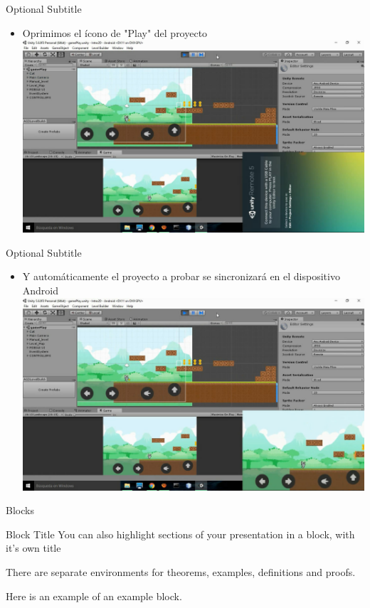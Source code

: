 \documentclass{beamer}
\begin{document}
\begin{frame}{07}{Optional Subtitle}
  \begin{itemize}
  \item {
    Oprimimos el ícono de "Play" del proyecto 
  }
  \includegraphics[width=\linewidth]{image2/UR07}
  \end{itemize}
\end{frame}

\begin{frame}{08}{Optional Subtitle}
  \begin{itemize}
  \item {
    Y automáticamente el proyecto a probar se sincronizará en el dispositivo Android
  }
  \includegraphics[width=\linewidth]{image2/UR08}
  \end{itemize}
\end{frame}

\begin{frame}{Blocks}
\begin{block}{Block Title}
You can also highlight sections of your presentation in a block, with it's own title
\end{block}
\begin{theorem}
There are separate environments for theorems, examples, definitions and proofs.
\end{theorem}
\begin{example}
Here is an example of an example block.
\end{example}
\end{frame}
\end{document}
